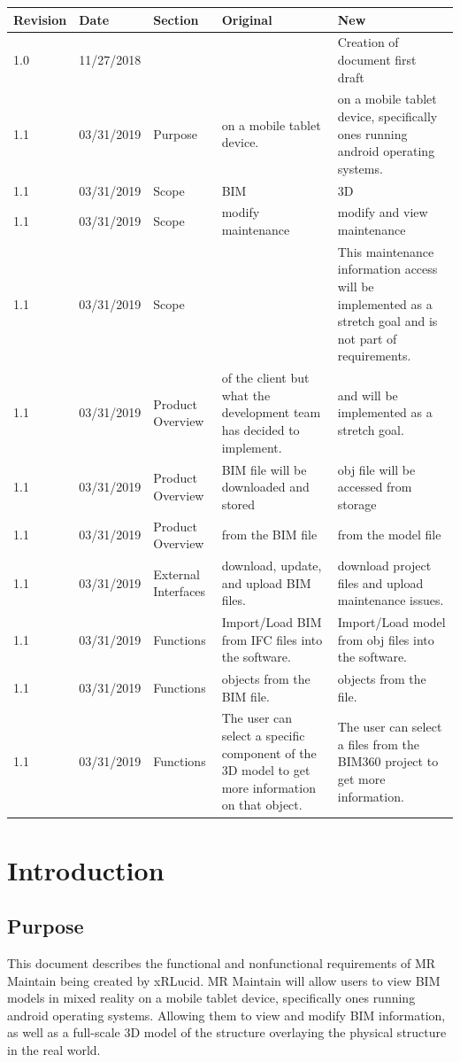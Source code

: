 \documentclass[onecolumn, draftclsnofoot,10pt, compsoc]{IEEEtran}
\begin{document}
\begin{tabular}{ p{2cm} p{2cm} p{2cm} p{} p{} }
 \textbf{Revision} & \textbf{Date} & \textbf{Section} & \textbf{Original} & \textbf{New} \\
 \hline
 1.0 & 11/27/2018 & & & Creation of document first draft \\
  \hline
 1.1 & 03/31/2019 & Purpose & on a mobile tablet device. & on a mobile tablet device, specifically ones running android operating systems. \\
  \hline
 1.1 & 03/31/2019 & Scope & BIM & 3D \\
   \hline
 1.1 & 03/31/2019 & Scope & modify maintenance & modify and view maintenance \\
 \hline
 1.1 & 03/31/2019 & Scope &  & This maintenance information access will be implemented as a
stretch goal and is not part of requirements. \\
 \hline
 1.1 & 03/31/2019 & Product Overview & of the client but what the development team has decided to implement. & and will be implemented as a stretch goal. \\
  \hline
 1.1 & 03/31/2019 & Product Overview & BIM file will be downloaded and stored & obj file will be accessed from storage \\
  \hline
 1.1 & 03/31/2019 & Product Overview & from the BIM file & from the model file \\
  \hline
 1.1 & 03/31/2019 & External Interfaces & download, update, and upload BIM files. & download project files and upload maintenance issues. \\
  \hline
 1.1 & 03/31/2019 & Functions & Import/Load BIM from IFC files into the software. & Import/Load model from obj files into the software. \\
  \hline
 1.1 & 03/31/2019 & Functions & objects from the BIM file. & objects from the file. \\
  \hline
 1.1 & 03/31/2019 & Functions & The user can select a specific component of the 3D model to get more information on that object. & The user can select a files from the BIM360 project to get more information.
\end{tabular}

\clearpage

\section{Introduction}

    \subsection{Purpose}
    This document describes the functional and nonfunctional requirements of MR Maintain being created by xRLucid. MR Maintain will allow users to view BIM models in mixed reality on a mobile tablet device, specifically ones running android operating systems. Allowing them to view and modify BIM information, as well as a full-scale 3D model of the structure overlaying the physical structure in the real world.\par
\end{document}
